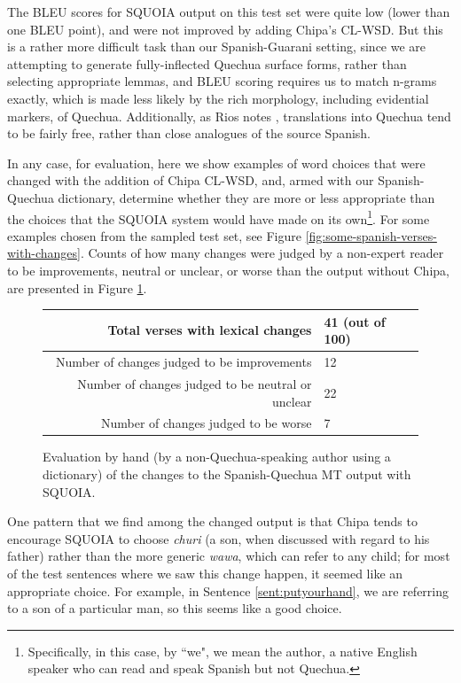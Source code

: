 The BLEU scores for SQUOIA output on this test set were quite low (lower than
one BLEU point), and were not improved by adding Chipa's CL-WSD. But this is a
rather more difficult task than our Spanish-Guarani setting, since we are
attempting to generate fully-inflected Quechua surface forms, rather than
selecting appropriate lemmas, and BLEU scoring requires us to match n-grams
exactly, which is made less likely by the rich morphology, including evidential
markers, of Quechua. Additionally, as Rios notes \cite[\S 5.9]{rios2015basic},
translations into Quechua tend to be fairly free, rather than close analogues
of the source Spanish.

In any case, for evaluation, here we show examples of word choices that were
changed with the addition of Chipa CL-WSD, and, armed with our Spanish-Quechua
dictionary\cite{academiamayor}, determine whether they are more or less
appropriate than the choices that the SQUOIA system would have made on its
own\footnote{Specifically, in this case, by ``we", we mean the author, a native
English speaker who can read and speak Spanish but not Quechua.}.
For some examples chosen from the sampled test set, see Figure
\ref{fig:some-spanish-verses-with-changes}. Counts of how many changes were
judged by a non-expert reader to be improvements, neutral or unclear, or
worse than the output without Chipa, are presented in Figure
\ref{fig:es-qu-evaluation}.

\begin{figure}
  \begin{centering}
  \begin{tabulary}{\textwidth}{|R|L|}
    \hline
    Total verses with lexical changes & 41 (out of 100) \\
    \hline
    Number of changes judged to be improvements &  12 \\
    \hline
    Number of changes judged to be neutral or unclear &  22 \\
    \hline
    Number of changes judged to be worse &  7 \\
    \hline
  \end{tabulary}
  \end{centering}
  \caption{Evaluation by hand (by a non-Quechua-speaking author using a
  dictionary) of the changes to the Spanish-Quechua MT output with SQUOIA.}
  \label{fig:es-qu-evaluation}
\end{figure}

One pattern that we find among the changed output is that Chipa tends to
encourage SQUOIA to choose \emph{churi} (a son, when discussed with regard to
his father) rather than the more generic \emph{wawa}, which can refer to any
child; for most of the test sentences where we saw this change happen, it
seemed like an appropriate choice. For example, in Sentence
\ref{sent:putyourhand}, we are referring to a son of a particular man, so this
seems like a good choice.

